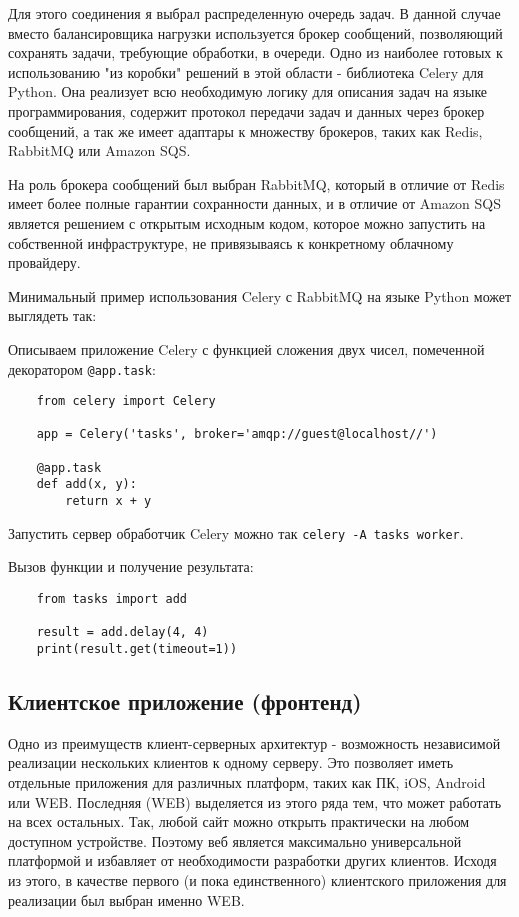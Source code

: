 Для этого соединения я выбрал распределенную очередь задач. В данной случае вместо балансировщика нагрузки используется брокер сообщений, позволяющий сохранять задачи, требующие обработки, в очереди. Одно из наиболее готовых к использованию "из коробки" решений в этой области - библиотека Celery для Python\cite{celery_website}. Она реализует всю необходимую логику для описания задач на языке программирования, содержит протокол передачи задач и данных через брокер сообщений, а так же имеет адаптары к множеству брокеров, таких как Redis, RabbitMQ или Amazon SQS.

На роль брокера сообщений был выбран RabbitMQ, который в отличие от Redis имеет более полные гарантии сохранности данных, и в отличие от Amazon SQS является решением с открытым исходным кодом, которое можно запустить на собственной инфраструктуре, не привязываясь к конкретному облачному провайдеру.

Минимальный пример использования Celery с RabbitMQ на языке Python может выглядеть так:

Описываем приложение Celery с функцией сложения двух чисел, помеченной декоратором \texttt{@app.task}:

\begin{lstlisting}
    from celery import Celery

    app = Celery('tasks', broker='amqp://guest@localhost//')

    @app.task
    def add(x, y):
        return x + y
\end{lstlisting}

Запустить сервер обработчик Celery можно так \texttt{celery -A tasks worker}.

Вызов функции и получение результата:

\begin{lstlisting}
    from tasks import add
    
    result = add.delay(4, 4)
    print(result.get(timeout=1))
\end{lstlisting}

\subsection{Клиентское приложение (фронтенд)}

Одно из преимуществ клиент-серверных архитектур - возможность независимой реализации нескольких клиентов к одному серверу. Это позволяет иметь отдельные приложения для различных платформ, таких как ПК, iOS, Android или WEB. Последняя (WEB) выделяется из этого ряда тем, что может работать на всех остальных. Так, любой сайт можно открыть практически на любом доступном устройстве. Поэтому веб является максимально универсальной платформой и избавляет от необходимости разработки других клиентов. Исходя из этого, в качестве первого (и пока единственного) клиентского приложения для реализации был выбран именно WEB.


